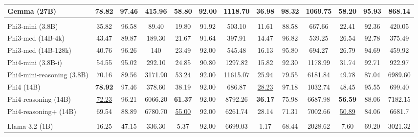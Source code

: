 \begin{table}
\begin{adjustbox}{width=\textwidth}
\begin{tabulary}{1.3\textwidth}{LCCCCCCCCCCCC}
Gemma (27B) & \textbf{78.82} & 97.46 & 415.96 & \textbf{58.80} & 92.00 & 1118.70 & \textbf{36.98} & 98.32 & 1069.75 &  \textbf{58.20} &  95.93 &  868.14 \\
\midrule
{}
 \\
\midrule
Phi3-mini (3.8B) & 35.82 & 96.58 & 89.40 & 19.80 & 91.92 & 503.10 & 11.61 & 88.58 & 667.66 &  22.41 &  92.36 &  420.05 \\
Phi3-med (14B-4k) & 43.47 & 89.87 & 189.30 & 21.67 & 91.64 & 397.91 & 14.47 & 96.82 & 539.25 &  26.54 &  92.78 &  375.49 \\
Phi3-med (14B-128k) & 40.76 & 96.26 & 140 & 23.49 & 92.00 & 545.48 & 16.13 & 95.80 & 694.27 &  26.79 &  94.69 &  459.92 \\
Phi4-mini (3.8B-i) & 54.55 & 95.02 & 292.10 & 24.85 & 90.80 & 1297.82 & 15.82 & 92.30 & 1178.99 &  31.74 &  92.71 &  922.97 \\
Phi4-mini-reasoning (3.8B) & 70.16 & 89.56 & 3171.90 & 53.24 & 92.00 & 11615.07 & 25.94 & 79.55 & 6181.84 &  49.78 &  87.04 &  6989.60 \\
Phi4 (14B) & \textbf{78.92} & 97.46 & 378.60 & 38.19 & 92.00 & 686.87 & \underline{28.23} & 97.18 & 1032.74 &  48.45 &  95.55 &  699.40 \\
Phi4-reasoning (14B) & \underline{72.23} & 96.21 & 6066.20 & \textbf{61.37} & 92.00 & 8792.26 & \textbf{36.17} & 75.98 & 6687.98 &  \textbf{56.59} &  88.06 &  7182.15 \\
Phi4-reasoning+ (14B) & 69.54 & 88.89 & 6780.70 & \underline{55.00} & 92.00 & 6261.74 & 28.14 & 71.31 & 7002.66 &  \underline{50.89} &  84.06 &  6681.7 \\
\midrule
{}
 \\
\midrule
Llama-3.2 (1B) & 16.25 & 47.15 & 336.30 & 5.37 & 92.00 & 6699.03 & 1.17 & 68.44 & 2028.62 &  7.60 &  69.20 &  3021.32 \\

\end{tabulary}
\end{adjustbox}
\end{table}
